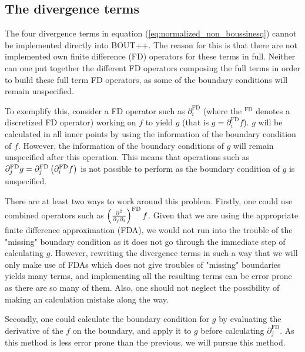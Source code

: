 \subsection{The divergence terms}
%
The four divergence terms in equation (\ref{eq:normalized_non_boussinesq})
cannot be implemented directly into BOUT++. The reason for this is that there
are not implemented own finite difference (FD) operators for these terms in
full. Neither can one put together the different FD operators composing the
full terms in order to build these full term FD operators, as some of the
boundary conditions will remain unspecified.

To exemplify this, consider a FD operator such as $\partial^{\text{FD}}_i$
(where the $^\text{FD}$ denotes a discretized FD operator) working on $f$ to
yield $g$ (that is $g = \partial^{\text{FD}}_if$). $g$ will be calculated in
all inner points by using the information of the boundary condition of $f$.
However, the information of the boundary conditions of $g$ will remain
unspecified after this operation.  This means that operations such as
$\partial^{\text{FD}}_j g = \partial_j^{\text{FD}}\left(\partial_i^{\text{FD}}
f\right)$ is not possible to perform as the boundary condition of $g$ is
unspecified.

There are at least two ways to work around this problem. Firstly, one could use
combined operators such as $\left(\frac{\partial {^2}}{\partial{_j\partial_i}}\right)^\text{FD}f$.  Given
that we are using the appropriate finite difference approximation (FDA), we
would not run into the trouble of the "missing" boundary condition as it does
not go through the immediate step of calculating $g$.  However, rewriting the
divergence terms in such a way that we will only make use of FDAs which does
not give troubles of "missing" boundaries yields many terms, and implementing
all the resulting terms can be error prone as there are so many of them. Also,
one should not neglect the possibility of making an calculation mistake along
the way.

Secondly, one could calculate the boundary condition for $g$ by evaluating the
derivative of the $f$ on the boundary, and apply it to $g$ before calculating
$\partial^{\text{FD}}_j$. As this method is less error prone than the previous,
we will pursue this method.


